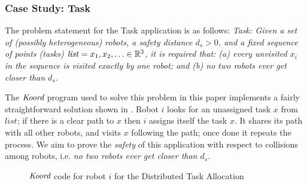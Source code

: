 
\newcommand{\Task}{\textsf{Task}\xspace}

\subsubsection{Case Study: \Task}
The problem statement for the \Task application is as follows: {\small \em \Task: Given a set of (possibly heterogeneous) robots, a safety distance $d_s>0$, and a fixed sequence of points (tasks) $\mathit{list} = x_1, x_2, \ldots \in \reals^3$, it is required that: (a) every unvisited $x_i$ in the sequence is {\em visited\/} exactly by one robot; and (b) no two robots ever get closer than $d_s$.\/}

The $\emph{Koord}$ program used to solve this problem in this paper implements a fairly straightforward solution shown in . Robot $i$ looks for an unassigned task $x$ from $\mathit{list}$; if there is a clear path to $x$ then $i$ assigns itself the task $x$. It shares its path with all other robots, and  visits $x$ following the path; once done it repeats the process.  We aim to prove the \emph{safety} of this application with respect to collisions among robots, i.e. \emph{no two robots ever get closer than $d_s$}.

\begin{figure}[t]
    {
    
    }
    {
    
    }
    \caption{ $\emph{Koord}$ code for robot $i$ for the Distributed Task Allocation}
    \label{fig:taskapp }
\end{figure}


